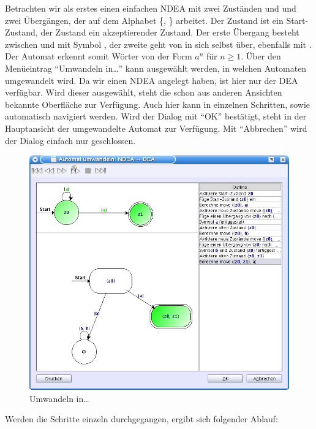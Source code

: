 Betrachten wir als erstes einen einfachen NDEA mit zwei Zuständen  und
 und zwei Übergängen, der auf dem Alphabet \{, \}
arbeitet. Der Zustand  ist ein Start-Zustand, der Zustand 
ein akzeptierender Zustand. Der erste Übergang besteht zwischen  und
 mit Symbol , der zweite geht von  in sich selbst
über, ebenfalls mit . Der Automat erkennt somit Wörter von der Form
$a^n$ für $n \geq 1$. Über den Menüeintrag "`Umwandeln in\ldots"' kann ausgewählt
werden, in welchen Automaten umgewandelt wird. Da wir einen NDEA angelegt haben,
ist hier nur der DEA verfügbar. Wird dieser ausgewählt, steht die schon aus
anderen Ansichten bekannte Oberfläche zur Verfügung. Auch hier kann in einzelnen
Schritten, sowie automatisch navigiert werden. Wird der Dialog mit "`OK"'
bestätigt, steht in der Hauptansicht der umgewandelte Automat zur Verfügung. Mit
"`Abbrechen"' wird der Dialog einfach nur geschlossen.\vspace{10pt}

\begin{figure}[h]
\begin{center}
\includegraphics[width=12cm]{images/convert_to.png}
\caption{Umwandeln in\ldots}
\end{center}
\end{figure}

Werden die Schritte einzeln durchgegangen, ergibt sich folgender Ablauf:

